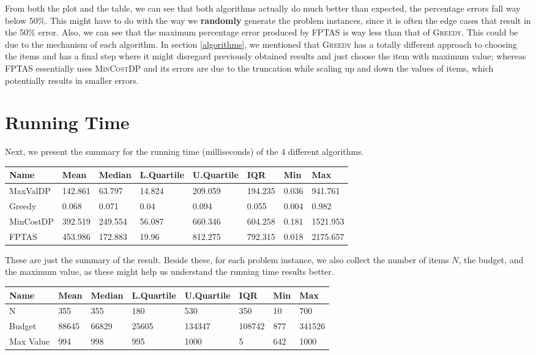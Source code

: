 \documentclass[12pt, oneside]{book}
\begin{document}
From both the plot and the table, we can see that both algorithms
actually do much better than expected, the percentage errors fall way
below 50\%. This might have to do with the way we \textbf{randomly}
generate the problem instances, since it is often the edge cases that
result in the 50\% error. Also, we can see that the maximum percentage
error produced by \textsc{FPTAS} is way less than that of
\textsc{Greedy}. This could be due to the mechanism of each algorithm.
In section \ref{algorithms}, we mentioned that \textsc{Greedy} has a
totally different approach to choosing the items and has a final step
where it might disregard previously obtained results and just choose the
item with maximum value; whereas \textsc{FPTAS} essentially uses
\textsc{MinCostDP} and its errors are due to the truncation while
scaling up and down the values of items, which potentially results in
smaller errors.

\section{Running Time}\label{running-time}

Next, we present the summary for the running time (milliseconds) of the
4 different algorithms.

\begin{longtable}[]{@{}llllllll@{}}
\toprule
Name & Mean & Median & L.Quartile & U.Quartile & IQR & Min &
Max\tabularnewline
\midrule
\endhead
MaxValDP & 142.861 & 63.797 & 14.824 & 209.059 & 194.235 & 0.036 &
941.761\tabularnewline
Greedy & 0.068 & 0.071 & 0.04 & 0.094 & 0.055 & 0.004 &
0.982\tabularnewline
MinCostDP & 392.519 & 249.554 & 56.087 & 660.346 & 604.258 & 0.181 &
1521.953\tabularnewline
FPTAS & 453.986 & 172.883 & 19.96 & 812.275 & 792.315 & 0.018 &
2175.657\tabularnewline
\bottomrule
\end{longtable}

These are just the summary of the result. Beside these, for each problem
instance, we also collect the number of items \(N\), the budget, and the
maximum value, as these might help us understand the running time
results better.

\begin{longtable}[]{@{}llllllll@{}}
\toprule
Name & Mean & Median & L.Quartile & U.Quartile & IQR & Min &
Max\tabularnewline
\midrule
\endhead
N & 355 & 355 & 180 & 530 & 350 & 10 & 700\tabularnewline
Budget & 88645 & 66829 & 25605 & 134347 & 108742 & 877 &
341526\tabularnewline
Max Value & 994 & 998 & 995 & 1000 & 5 & 642 & 1000\tabularnewline
\bottomrule
\end{longtable}
\end{document}
